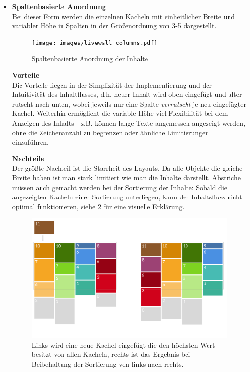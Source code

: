 \documentclass[12pt,twoside]{book}
\begin{document}
\begin{itemize}
  \item \textbf{Spaltenbasierte Anordnung} \\
  Bei dieser Form werden die einzelnen Kacheln mit einheitlicher Breite und variabler Höhe in Spalten in der Größenordnung von 3-5 dargestellt.

  \begin{figure}[h]
    \centering
    \texttt{[image: images/livewall\_columns.pdf]}
    \caption{Spaltenbasierte Anordnung der Inhalte}
    \label{fig:awesome_image}
  \end{figure}

  \textbf{Vorteile} \\
  Die Vorteile liegen in der Simplizität der Implementierung und der Intuitivität des Inhaltflusses, d.h. neuer Inhalt wird oben eingefügt und alter rutscht nach unten, wobei jeweils nur eine Spalte \textit{verrutscht} je neu eingefügter Kachel.
  Weiterhin ermöglicht die variable Höhe viel Flexibilität bei dem Anzeigen des Inhalts - z.B. können lange Texte angemessen angezeigt werden, ohne die Zeichenanzahl zu begrenzen oder ähnliche Limitierungen einzuführen.

  \textbf{Nachteile}\\
  Der größte Nachteil ist die Starrheit des Layouts. Da alle Objekte die gleiche Breite haben ist man stark limitiert wie man die Inhalte darstellt. Abstriche müssen auch gemacht werden bei der Sortierung der Inhalte: Sobald die angezeigten Kacheln einer Sortierung unterliegen, kann der Inhaltsfluss nicht optimal funktionieren, siehe \ref{fig:livewall_sort} für eine visuelle Erklärung.

  \begin{figure}[h]
    \centering
    \includegraphics[width=1.0\textwidth]{images/livewall_sort.png}
    \caption{Links wird eine neue Kachel eingefügt die den höchsten Wert besitzt von allen Kacheln, rechts ist das Ergebnis bei Beibehaltung der Sortierung von links nach rechts.}
    \label{fig:livewall_sort}
  \end{figure}


\end{itemize}
\end{document}
